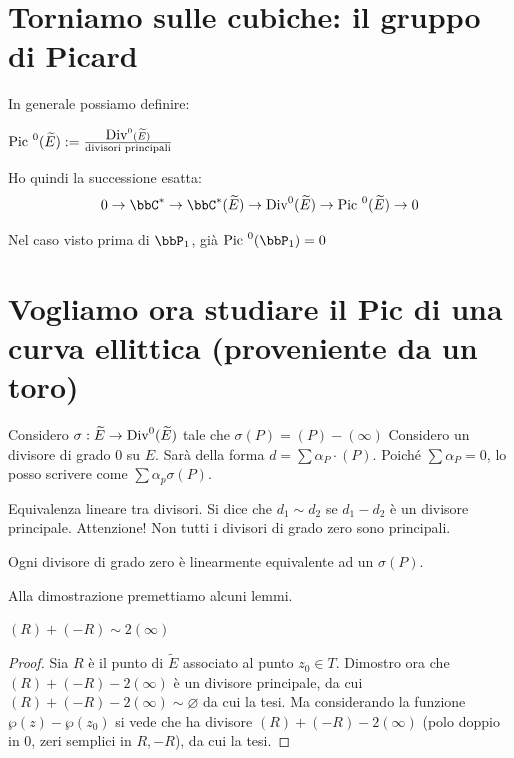 \section{Torniamo sulle cubiche: il gruppo di Picard}
In generale possiamo definire:

\begin{definizione}
$\mbox{Pic }^0(\widetilde{E}) := \frac{\mbox{Div}^0(\widetilde{E})}{\text{divisori principali}}$
\end{definizione}

\begin{osservazione}
Ho quindi la successione esatta:
$$0 \rightarrow \bbC^* \rightarrow \bbC^*(\widetilde{E}) \rightarrow \Div^0(\widetilde{E})\rightarrow \Pic^0(\widetilde{E})\rightarrow 0$$
\end{osservazione}

Nel caso visto prima di $\bbP_1$, già $\Pic^0(\bbP_1)=0$


\section{Vogliamo ora studiare il Pic di una curva ellittica (proveniente da un toro)}

Considero $\sigma : \widetilde E \rightarrow \mbox{Div}^0(\widetilde E)$ tale che $\sigma(P)=(P)-(\infty)$
Considero un divisore di grado $0$ su $E$. Sarà della forma $d = \sum\alpha_P\cdot(P)$.
Poiché $\sum \alpha_P=0$, lo posso scrivere come $\sum\alpha_p \sigma(P)$.

\begin{definizione}
Equivalenza lineare tra divisori. Si dice che $d_1 \sim d_2$ se $d_1-d_2$ è un divisore principale. Attenzione! Non tutti i divisori di grado zero sono principali.
\end{definizione}

\begin{teorema}
  \label{teorema_divisori_semplici}
Ogni divisore di grado zero è linearmente equivalente ad un $\sigma(P)$.
\end{teorema}

Alla dimostrazione premettiamo alcuni lemmi. 
\begin{lemma}
  \label{lemma_equiv_lin}
$(R) + (-R) \sim 2(\infty)$
\end{lemma}
\begin{proof}
Sia $R$ è il punto di $\widetilde E$ associato al punto $z_0 \in T$.
Dimostro ora che $(R)+(-R)-2(\infty)$ è un divisore principale, da cui $(R)+(-R)-2(\infty) \sim \varnothing$ da cui la tesi.
Ma considerando la funzione $\wp(z)-\wp(z_0)$ si vede che ha divisore $(R)+(-R)-2(\infty)$ (polo doppio in $0$, zeri semplici in $R,-R$), da cui la tesi.
\end{proof}

